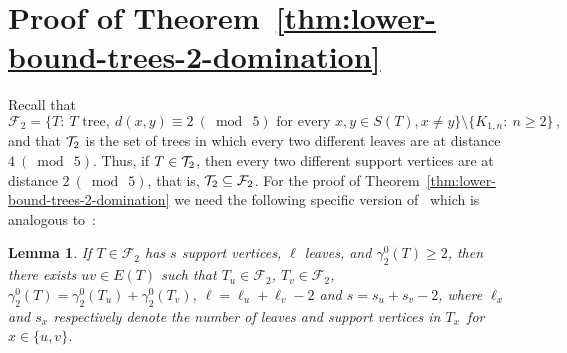 \documentclass[12pt]{article}
\newtheorem{lemma}[theorem]{Lemma}
\newcommand{\F}{\mathcal{F}}
\begin{document}
\section{Proof of Theorem~\ref{thm:lower-bound-trees-2-domination}}
\label{sec:proof1}

Recall that 
$$\F_2 = \{ T:\ T \text{ tree},\ d(x,y) \equiv 2\ (\bmod\ {5}) \text{ for every } x, y \in S(T), x\ne y\} \setminus \{K_{1,n}:\ n \geq 2\}\,,$$
and that ${\cal T}_2$ is the set of trees in which every two different leaves are at distance $4\ (\bmod\ 5)$. Thus, if $T\in {\cal T}_2$, then every two different support vertices are at distance $2\ (\bmod\ 5)$, that is, ${\cal T}_2 \subseteq \F_2$. For the proof of Theorem~\ref{thm:lower-bound-trees-2-domination} we need the following specific version of~\cite[Lemma 2.1]{Meierling-2005} which is analogous to~\cite[Lemma 2.3]{Meierling-2005}: 

\begin{lemma}
    \label{lem:remove-edge}
    If $T \in \F_2$ has $s$ support vertices, $\ell$ leaves, and $\gamma_2^0(T) \geq 2$, then there exists $uv \in E(T)$ such that $T_u \in \F_2$, $T_v \in \F_2$, $\gamma_2^0(T) = \gamma_2^0(T_u) + \gamma_2^0(T_v)$, $\ell = \ell_u + \ell_v - 2$ and $s = s_u + s_v - 2$, where $\ell_x$ and $s_x$ respectively denote the number of leaves and support vertices in $T_x$\ for $x \in \{u,v\}$.
\end{lemma}
\end{document}
